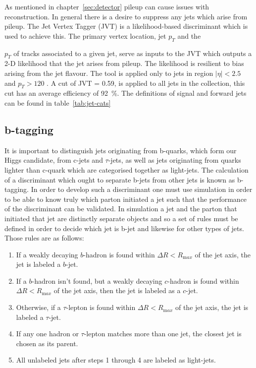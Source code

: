 As mentioned in chapter~\ref{sec:detector} pileup can cause issues with
reconstruction. In general there is a desire to suppress any jets which arise
from pileup. The Jet Vertex Tagger (JVT) is a likelihood-based discriminant
which is used to achieve this. The primary vertex location, jet $p_T$ and the

$p_T$ of tracks associated to a given jet, serve as inputs to the JVT which
outputs a 2-D likelihood that the jet arises from pileup. The likelihood is
resilient to bias arising from the jet flavour. The tool is applied only to jets
in region $\lvert  \eta \rvert < 2.5$ and $p_T > 120$ \GeV. A cut of JVT = 0.59,
is applied to all jets in the collection, this cut has an average efficiency of
92~\%. The definitions of signal and forward jets can be found in table~\ref{tab:jet-cats}


\subsection{b-tagging}

It is important to distinguish jets originating from b-quarks, which form our
Higgs candidate, from c-jets and $\tau$-jets, as well as jets originating from
quarks lighter than c-quark which are categorised together as light-jets. The
calculation of a discriminant which ought to separate b-jets from other jets is
known as b-tagging. In order to develop such a discriminant one must use
simulation in order to be able to know truly which parton initiated a jet such
that the performance of the discriminant can be validated. In simulation a jet
and the parton that initiated that jet are distinctly separate objects and so a
set of rules must be defined in order to decide which jet is b-jet and likewise
for other types of jets. Those rules are as follows:
\begin{enumerate}
\item  If a weakly decaying $b$-hadron is found within $\Delta R<R_{\mathrm max}$ of the
  jet axis, the jet is labeled a $b$-jet.
\item  If a $b$-hadron isn't found, but a weakly decaying $c$-hadron is
  found within $\Delta R<R_{\mathrm max}$ of the jet axis, then the jet is labeled as a $c$-jet.
\item  Otherwise, if a $\tau$-lepton is found within
  $\Delta R<R_{\mathrm max}$ of the jet axis, the jet is labeled a $\tau$-jet.
\item If any one hadron or $\tau$-lepton matches more than one jet, the closest jet
  is chosen as its parent.
\item All unlabeled jets after steps 1 through 4 are labeled as light-jets.
\end{enumerate}

